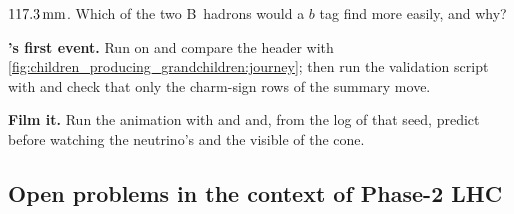 \begin{exercises}
  $117.3\,\mathrm{mm}$. Which of the two B~hadrons would a $b$ tag find more easily,
  and why?
\item \textbf{\PYTHIA's first event.} Run  on
   and compare the
  header with \cref{fig:children_producing_grandchildren:journey}; then
  run the validation script with 
  and check that only the charm-sign rows of the summary move.
\item \textbf{Film it.} Run the animation with 
  and  and, from the  log of that seed, predict
  before watching the neutrino's \pt and the visible \pt of the cone.
\end{exercises}

\subsection*{Open problems in the context of Phase-2 LHC}
\label{sec:children_producing_grandchildren:open_problems}

